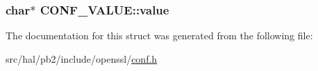 \subsubsection[{\texorpdfstring{value}{value}}]{\setlength{\rightskip}{0pt plus 5cm}char$\ast$ C\+O\+N\+F\+\_\+\+V\+A\+L\+U\+E\+::value}\hypertarget{struct_c_o_n_f___v_a_l_u_e_adc4e5ad327beced987b0d51bc4bdeb6e}{}\label{struct_c_o_n_f___v_a_l_u_e_adc4e5ad327beced987b0d51bc4bdeb6e}


The documentation for this struct was generated from the following file\+:\begin{DoxyCompactItemize}
\item 
src/hal/pb2/include/openssl/\hyperlink{conf_8h}{conf.\+h}\end{DoxyCompactItemize}
